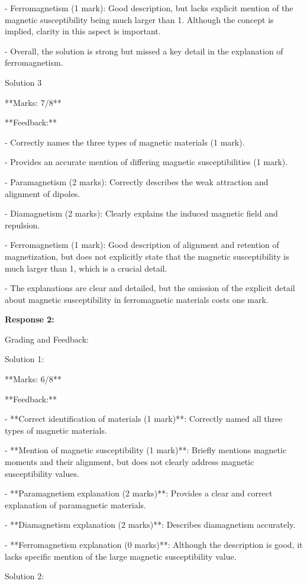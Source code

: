 \documentclass[a4paper,11pt]{article}
\begin{document}
- Ferromagnetism (1 mark): Good description, but lacks explicit mention of the magnetic susceptibility being much larger than 1. Although the concept is implied, clarity in this aspect is important.

- Overall, the solution is strong but missed a key detail in the explanation of ferromagnetism.

Solution 3

**Marks: 7/8**

**Feedback:**

- Correctly names the three types of magnetic materials (1 mark).

- Provides an accurate mention of differing magnetic susceptibilities (1 mark).

- Paramagnetism (2 marks): Correctly describes the weak attraction and alignment of dipoles.

- Diamagnetism (2 marks): Clearly explains the induced magnetic field and repulsion.

- Ferromagnetism (1 mark): Good description of alignment and retention of magnetization, but does not explicitly state that the magnetic susceptibility is much larger than 1, which is a crucial detail.

- The explanations are clear and detailed, but the omission of the explicit detail about magnetic susceptibility in ferromagnetic materials costs one mark.

\bigskip    
\textbf{Response 2:}

Grading and Feedback:

Solution 1:

**Marks: 6/8**

**Feedback:**

- **Correct identification of materials (1 mark)**: Correctly named all three types of magnetic materials.

- **Mention of magnetic susceptibility (1 mark)**: Briefly mentions magnetic moments and their alignment, but does not clearly address magnetic susceptibility values.

- **Paramagnetism explanation (2 marks)**: Provides a clear and correct explanation of paramagnetic materials.

- **Diamagnetism explanation (2 marks)**: Describes diamagnetism accurately.

- **Ferromagnetism explanation (0 marks)**: Although the description is good, it lacks specific mention of the large magnetic susceptibility value.

Solution 2:
\end{document}
